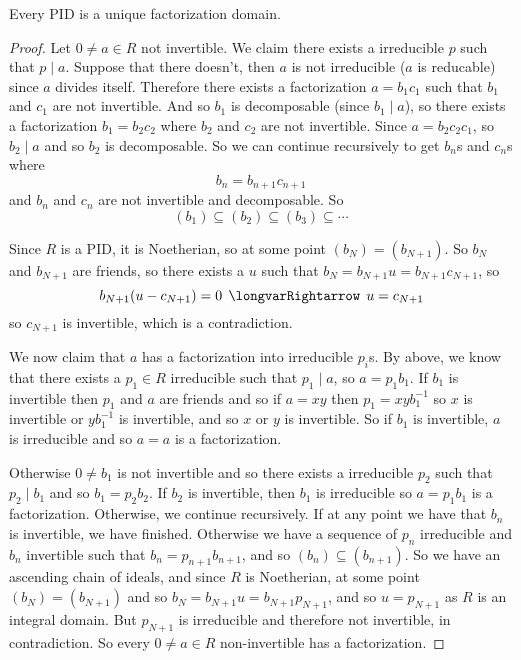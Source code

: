 \documentclass[10pt]{article}
\def\implies{\,\mathrel{\longvarRightarrow}\,}
\def\divides{{\mid}}
\begin{document}
\begin{prop*}

    Every PID is a unique factorization domain.

\end{prop*}

\begin{proof}

    Let $0\neq a\in R$ not invertible.
    We claim there exists a irreducible $p$ such that $p\divides a$.
    Suppose that there doesn't, then $a$ is not irreducible ($a$ is reducable) since $a$ divides itself.
    Therefore there exists a factorization $a=b_1c_1$ such that $b_1$ and $c_1$ are not invertible.
    And so $b_1$ is decomposable (since $b_1\divides a$), so there exists a factorization $b_1=b_2c_2$ where $b_2$ and $c_2$ are not invertible.
    Since $a=b_2c_2c_1$, so $b_2\divides a$ and so $b_2$ is decomposable.
    So we can continue recursively to get $b_n$s and $c_n$s where
    \[ b_n = b_{n+1}c_{n+1} \]
    and $b_n$ and $c_n$ are not invertible and decomposable.
    So
    \[ (b_1) \subseteq (b_2) \subseteq (b_3) \subseteq \cdots \]

    Since $R$ is a PID, it is Noetherian, so at some point $(b_N)=(b_{N+1})$.
    So $b_N$ and $b_{N+1}$ are friends, so there exists a $u$ such that $b_N=b_{N+1}u=b_{N+1}c_{N+1}$, so
    \[ b_{N+1}(u-c_{N+1}) = 0 \implies u = c_{N+1} \]
    so $c_{N+1}$ is invertible, which is a contradiction.

    We now claim that $a$ has a factorization into irreducible $p_i$s.
    By above, we know that there exists a $p_1\in R$ irreducible such that $p_1\divides a$, so $a=p_1b_1$.
    If $b_1$ is invertible then $p_1$ and $a$ are friends and so if $a=xy$ then $p_1=xyb_1^{-1}$ so $x$ is invertible or $yb_1^{-1}$ is invertible, and so $x$ or $y$ is invertible.
    So if $b_1$ is invertible, $a$ is irreducible and so $a=a$ is a factorization.

    Otherwise $0\neq b_1$ is not invertible and so there exists a irreducible $p_2$ such that $p_2\divides b_1$ and so $b_1=p_2b_2$.
    If $b_2$ is invertible, then $b_1$ is irreducible so $a=p_1b_1$ is a factorization.
    Otherwise, we continue recursively.
    If at any point we have that $b_n$ is invertible, we have finished.
    Otherwise we have a sequence of $p_n$ irreducible and $b_n$ invertible such that $b_n=p_{n+1}b_{n+1}$, and so $(b_n)\subseteq(b_{n+1})$.
    So we have an ascending chain of ideals, and since $R$ is Noetherian, at some point $(b_N)=(b_{N+1})$ and so $b_N=b_{N+1}u=b_{N+1}p_{N+1}$, and so $u=p_{N+1}$ as $R$ is an integral domain.
    But $p_{N+1}$ is irreducible and therefore not invertible, in contradiction.
    So every $0\neq a\in R$ non-invertible has a factorization.


\end{proof}
\end{document}
